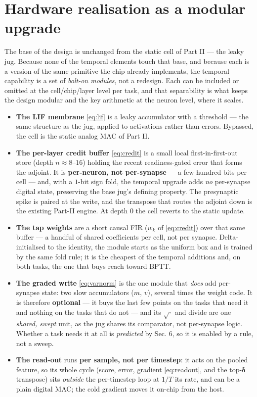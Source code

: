 \documentclass[11pt]{article}
\providecommand{\tightlist}{\setlength{\itemsep}{0pt}\setlength{\parskip}{0pt}}
\begin{document}
\hypertarget{sec:hardware}{%
\section{Hardware realisation as a modular upgrade}\label{sec:hardware}}

The base of the design is unchanged from the static cell of Part II ---
the leaky jug. Because none of the temporal elements touch that base,
and because each is a version of the same primitive the chip already
implements, the temporal capability is a set of \emph{bolt-on modules},
not a redesign. Each can be included or omitted at the cell/chip/layer
level per task, and that separability is what keeps the design modular
and the key arithmetic at the neuron level, where it scales.

\begin{itemize}
\tightlist
\item
  \textbf{The LIF membrane} \eqref{eq:lif} is a leaky accumulator with a
  threshold --- the same structure as the jug, applied to activations
  rather than errors. Bypassed, the cell is the static analog MAC of
  Part II.
\item
  \textbf{The per-layer credit buffer} \eqref{eq:credit} is a small
  local first-in-first-out store (depth \(n\approx8\)--\(16\)) holding
  the recent readiness-gated error that forms the adjoint. It is
  \textbf{per-neuron, not per-synapse} --- a few hundred bits per cell
  --- and, with a \(1\)-bit sign fold, the temporal upgrade adds
  \emph{no} per-synapse digital state, preserving the base jug's
  defining property. The presynaptic spike is paired at the write, and
  the transpose that routes the adjoint down is the existing Part-II
  engine. At depth \(0\) the cell reverts to the static update.
\item
  \textbf{The tap weights} are a short causal FIR (\(w_k\) of
  \eqref{eq:credit}) over that same buffer --- a handful of shared
  coefficients per cell, not per synapse. Delta-initialised to the
  identity, the module starts as the uniform box and is trained by the
  same fold rule; it is the cheapest of the temporal additions and, on
  both tasks, the one that buys reach toward BPTT.
\item
  \textbf{The graded write} \eqref{eq:varnorm} is the one module that
  \emph{does} add per-synapse state: two slow accumulators (\(m\),
  \(v\)), several times the weight code. It is therefore
  \textbf{optional} --- it buys the last few points on the tasks that
  need it and nothing on the tasks that do not --- and its
  \(\sqrt{\cdot}\) and divide are one \emph{shared, swept} unit, as the
  jug shares its comparator, not per-synapse logic. Whether a task needs
  it at all is \emph{predicted} by Sec. 6, so it is enabled by a rule,
  not a sweep.
\item
  \textbf{The read-out} runs \textbf{per sample, not per timestep}: it
  acts on the pooled feature, so its whole cycle (score, error, gradient
  \eqref{eq:readout}, and the top-\(\bm\delta\) transpose) sits
  \emph{outside} the per-timestep loop at \(1/T\) its rate, and can be a
  plain digital MAC; the cold gradient moves it on-chip from the host.
\end{itemize}
\end{document}
